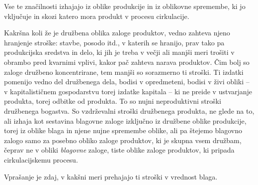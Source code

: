 \documentclass[kapital_02.tex]{subfiles}
\begin{document}
Vse te značilnosti izhajajo iz oblike produkcije in iz oblikovne spremembe, ki jo vključuje in skozi katero mora produkt v procesu cirkulacije.

Kakršna koli že je družbena oblika zaloge produktov, vedno zahteva njeno hranjenje stroške: stavbe, posodo itd., v katerih se hranijo, prav tako pa produkcijska sredstva in delo, ki jih je treba v večji ali manjši meri trošiti v obrambo pred kvarnimi vplivi, kakor pač zahteva narava produktov.
Čim bolj so zaloge družbeno koncentrirane, tem manjši so sorazmerno ti stroški.
Ti izdatki pomenijo vedno del družbenega dela, bodisi v opredmeteni, bodisi v živi obliki -- v kapitalističnem gospodarstvu torej izdatke kapitala -- ki ne preide v ustvarjanje produkta, torej odbitke od produkta.
To so nujni neproduktivni stroški družbenega bogastva.
So vzdrževalni stroški družbenega produkta, ne glede na to, ali izhaja kot sestavina blagovne zaloge izključno iz družbene oblike produkcije, torej iz oblike blaga in njene nujne spremembe oblike, ali pa štejemo blagovno zalogo samo za posebno obliko zaloge produktov, ki je skupna vsem družbam, čeprav ne v obliki \emph{blagovne} zaloge, tiste oblike zaloge produktov, ki pripada cirkulacijskemu procesu.

Vprašanje je zdaj, v kakšni meri prehajajo ti stroški v vrednost blaga.
\end{document}
